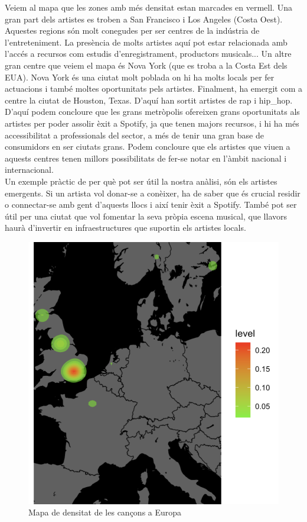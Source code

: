 Veiem al mapa que les zones amb més densitat estan marcades en vermell. Una gran part dels artistes es troben a San Francisco i Los Angeles (Costa Oest). Aquestes regions són molt conegudes per ser centres de la indústria de l'entreteniment. La presència de molts artistes aquí pot estar relacionada amb l'accés a recursos com estudis d'enregistrament, productors musicals... Un altre gran centre que veiem el mapa és Nova York (que es troba a la Costa Est dels EUA). Nova York és una ciutat molt poblada on hi ha molts locals per fer actuacions i també moltes oportunitats pels artistes. Finalment, ha emergit com a centre la ciutat de Houston, Texas. D'aquí han sortit artistes de rap i hip\_hop.\\

D'aquí podem concloure que les grans metròpolis ofereixen grans oportunitats als artistes per poder assolir èxit a Spotify, ja que tenen majors recursos, i hi ha més accessibilitat a professionals del sector, a més de tenir una gran base de consumidors en ser ciutats grans. Podem concloure que els artistes que viuen a aquests centres tenen millors possibilitats de fer-se notar en l'àmbit nacional i internacional. \\

Un exemple pràctic de per què pot ser útil la nostra anàlisi, són els artistes emergents. Si un artista vol donar-se a conèixer, ha de saber que és crucial residir o connectar-se amb gent d'aquests llocs i així tenir èxit a Spotify. També pot ser útil per una ciutat que vol fomentar la seva pròpia escena musical, que llavors haurà d'invertir en infraestructures que suportin els artistes locals. \\


\begin{figure}[H]
    \centering
    \includegraphics[width=0.4\linewidth]{Images/7_Geospatial/1_descriptive/mapa_densitat_europa.png}
    \caption{Mapa de densitat de les cançons a Europa}
    \label{fig:geo_mapa_den_europa}
\end{figure}

